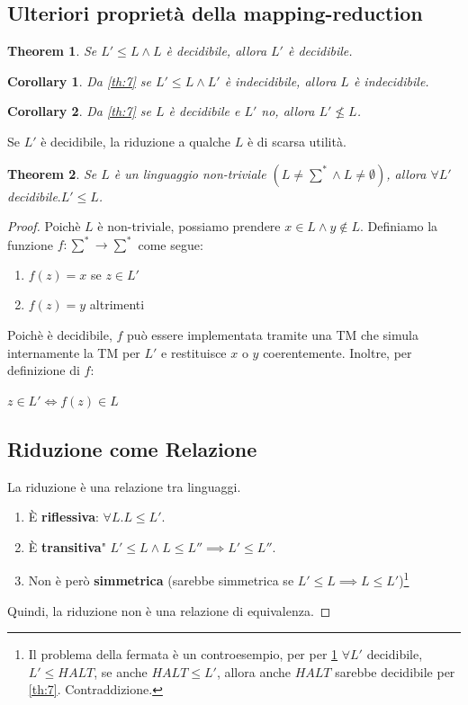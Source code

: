 \documentclass[a4paper, 12pt]{article}
\newtheorem{theorem}{Theorem}[section]
\newtheorem{corollary}{Corollary}[theorem]
\begin{document}
\subsection{Ulteriori propriet\`a della mapping-reduction}
\begin{theorem}
\label{th:8}
Se $L' \leq L \land L$ \`e decidibile, allora $L'$ \`e decidibile.
\end{theorem}
\begin{corollary}
Da \ref{th:7} se $L' \leq L \land L'$ \`e indecidibile, allora $L$ \`e indecidibile.
\end{corollary}
\begin{corollary}
Da \ref{th:7} se $L$ \`e decidibile e $L'$ no, allora $L' \nleq L$.
\end{corollary}
Se $L'$ \`e decidibile, la riduzione a qualche $L$ \`e di scarsa utilit\`a.
\begin{theorem}
\label{th:9}
Se $L$ \`e un linguaggio non-triviale $(L \neq \sum^{*} \land L \neq \emptyset)$, allora $\forall L'$ decidibile$.L' \leq L$.
\end{theorem}
\begin{proof}
Poich\`e $L$ \`e non-triviale, possiamo prendere $x \in L \land y \notin L$. Definiamo la funzione $f: \sum^{*} \rightarrow \sum^{*}$ come segue:
\begin{enumerate}
\item $f(z) = x$ se $z \in L'$
\item $f(z) = y$ altrimenti 
\end{enumerate}
Poich\`e \`e decidibile, $f$ pu\`o essere implementata tramite una TM che simula internamente la TM per $L'$ e restituisce $x$ o $y$ coerentemente. Inoltre, per definizione di $f$: \begin{center}
$z \in L' \iff f(z) \in L$
\end{center}
\subsection{Riduzione come Relazione}
La riduzione \`e una relazione tra linguaggi.\begin{enumerate}
\item \`E \textbf{riflessiva}: $\forall L. L \leq L'$.
\item \`E \textbf{transitiva}" $L' \leq L \land L \leq L''  \implies L' \leq L''$.
\item Non \`e per\`o \textbf{simmetrica} (sarebbe simmetrica se $L' \leq L \implies L \leq L'$)\footnote{Il problema della fermata \`e un controesempio, per per \ref{th:8} $\forall L'$ decidibile, $L' \leq HALT$, se anche $HALT \leq L'$, allora anche $HALT$ sarebbe decidibile per \ref{th:7}. Contraddizione.} 
\end{enumerate}
Quindi, la riduzione non \`e una relazione di equivalenza. 
\end{proof}
\end{document}
